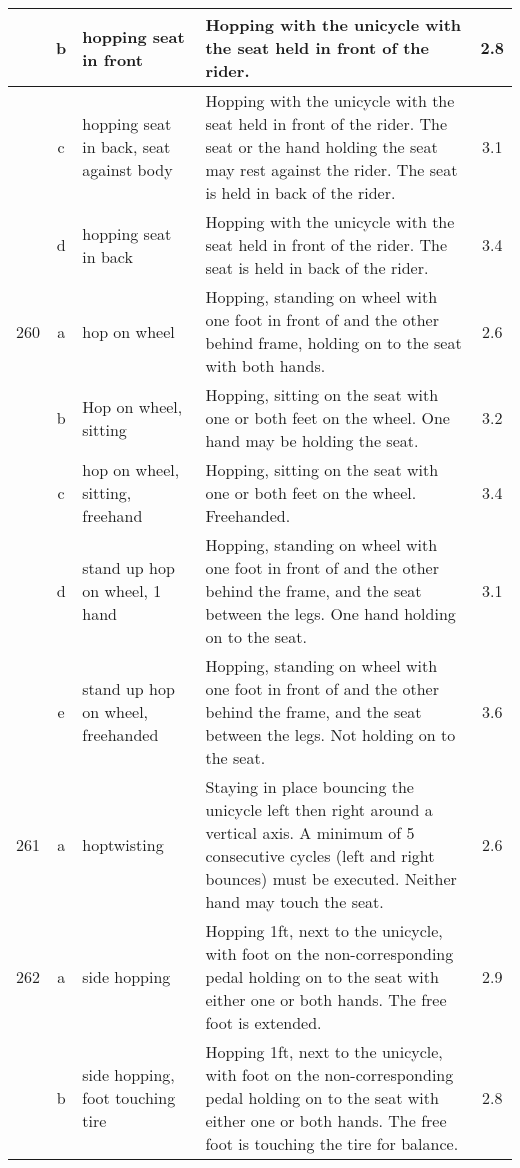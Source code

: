 \begin{longtable}{|r|c|p{4cm}|p{8cm}|c|}
  & b & hopping seat in front & Hopping with the unicycle with the seat held in front of the rider. & 2.8 \\ 
\hline
  & c & hopping seat in back, seat against body & Hopping with the unicycle with the seat held in front of the rider. The seat or the hand holding the seat may rest against the rider. The seat is held in back of the rider.  & 3.1 \\ 
\hline
  & d & hopping seat in back  & Hopping with the unicycle with the seat held in front of the rider. The seat is held in back of the rider.  & 3.4 \\ 
\hline
260 & a & hop on wheel  & Hopping, standing on wheel with one foot in front of and the other behind frame, holding on to the seat with both hands.  & 2.6 \\ 
\hline
  & b & Hop on wheel, sitting & Hopping, sitting on the seat with one or both feet on the wheel. One hand may be holding the seat.  & 3.2 \\ 
\hline
  & c & hop on wheel, sitting, freehand & Hopping, sitting on the seat with one or both feet on the wheel. Freehanded.  & 3.4 \\ 
\hline
  & d & stand up hop on wheel, 1 hand & Hopping, standing on wheel with one foot in front of and the other behind the frame, and the seat between the legs. One hand holding on to the seat.  & 3.1 \\ 
\hline
  & e & stand up hop on wheel, freehanded & Hopping, standing on wheel with one foot in front of and the other behind the frame, and the seat between the legs. Not holding on to the seat. & 3.6 \\ 
\hline
261 & a & hoptwisting & Staying in place bouncing the unicycle left then right around a vertical axis. A minimum of 5 consecutive cycles (left and right bounces) must be executed. Neither hand may touch the seat.  & 2.6 \\ 
\hline
262 & a & side hopping  & Hopping 1ft, next to the unicycle, with foot on the non-corresponding pedal holding on to the seat with either one or both hands. The free foot is extended.  & 2.9 \\ 
\hline
  & b & side hopping, foot touching tire  & Hopping 1ft, next to the unicycle, with foot on the non-corresponding pedal holding on to the seat with either one or both hands. The free foot is touching the tire for balance. & 2.8 \\ 
\hline
\end{longtable}

